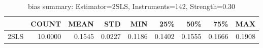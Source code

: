 \begin{table}[ht]
\centering
\caption{bias summary: Estimator=2SLS, Instruments=142, Strength=0.30}
\begin{tabular}{lrrrrrrrr}
\toprule
 & COUNT & MEAN & STD & MIN & 25\% & 50\% & 75\% & MAX \\
\midrule
2SLS & 10.0000 & 0.1545 & 0.0227 & 0.1186 & 0.1402 & 0.1555 & 0.1666 & 0.1908 \\
\bottomrule
\end{tabular}
\end{table}
